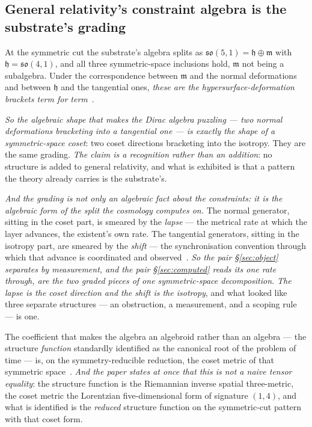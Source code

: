 \documentclass[11pt,a4paper]{article}
\theoremstyle{plain}
\theoremstyle{definition}
\begin{document}
\subsection{General relativity's constraint algebra is the substrate's grading}

At the symmetric cut the substrate's algebra splits as
$\mathfrak{so}(5,1)=\mathfrak{h}\oplus\mathfrak{m}$ with $\mathfrak{h}=\mathfrak{so}(4,1)$, and all three
symmetric-space inclusions hold, $\mathfrak m$ not being a subalgebra. Under the correspondence between
$\mathfrak m$ and the normal deformations and between $\mathfrak h$ and the tangential ones, \emph{these are
the hypersurface-deformation brackets term for term}~\cite{JanzenAlgebroid}.

\emph{So the algebraic shape that makes the Dirac algebra puzzling --- two normal deformations bracketing
into a tangential one --- is exactly the shape of a symmetric-space coset}: two coset directions bracketing
into the isotropy. They are the same grading. \emph{The claim is a recognition rather than an addition}: no
structure is added to general relativity, and what is exhibited is that a pattern the theory already carries
is the substrate's.

\emph{And the grading is not only an algebraic fact about the constraints: it is the algebraic form of the
split the cosmology computes on.} The normal generator, sitting in the coset part, is smeared by the
\emph{lapse} --- the metrical rate at which the layer advances, the existent's own rate. The
tangential generators, sitting in the isotropy part, are smeared by the \emph{shift} --- the
synchronisation convention through which that advance is coordinated and
observed~\cite{JanzenAlgebroid}. \emph{So the pair \S\ref{sec:object} separates by measurement, and the pair
\S\ref{sec:computed} reads its one rate through, are the two graded pieces of one symmetric-space
decomposition.} \emph{The lapse is the coset direction and the shift is the isotropy}, and what looked like
three separate structures --- an obstruction, a measurement, and a scoping rule --- is one.

The coefficient that makes the algebra an algebroid rather than an algebra --- the structure \emph{function}
standardly identified as the canonical root of the problem of time --- is, on the symmetry-reducible
reduction, the coset metric of that symmetric space~\cite{JanzenAlgebroid}. \emph{And the paper states at
once that this is not a naive tensor equality}: the structure function is the Riemannian inverse spatial
three-metric, the coset metric the Lorentzian five-dimensional form of signature $(1,4)$, and what is
identified is the \emph{reduced} structure function on the symmetric-cut pattern with that coset form.
\end{document}
